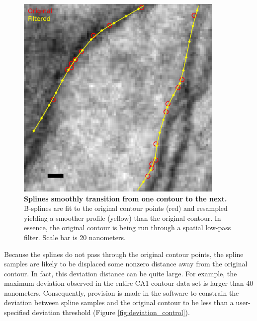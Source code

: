 \documentclass[12pt]{article}
\begin{document}
\begin{figure}[htb]
  \begin{center}
    \includegraphics[width=10cm]{figures/smoothing.pdf}
    \caption{\textbf{Splines smoothly transition from one contour
    to the next.} B-splines are fit to the original contour points
    (red) and resampled yielding a smoother profile (yellow) than the
    original contour. In essence, the original contour is being run
    through a spatial low-pass filter. Scale bar is 20 nanometers.}
    \label{fig:smoothing}
  \end{center}
\end{figure}

Because the splines do not pass through the original contour points, the
spline samples are likely to be displaced some nonzero distance away from
the original contour. In fact, this deviation distance can be quite large.
For example, the maximum deviation observed in the entire CA1 contour data
set is larger than 40 nanometers. Consequently, provision is made in
the software to constrain the deviation between spline samples and the
original contour to be less than a user-specified deviation threshold
(Figure \ref{fig:deviation_control}).
\end{document}
